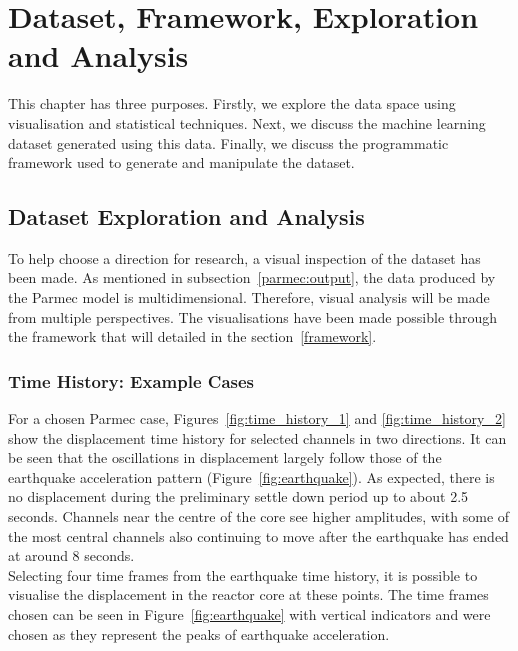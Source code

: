 \chapter{Dataset, Framework, Exploration and Analysis}
\label{cha:dataset}

This chapter has three purposes. Firstly, we explore  the data space using visualisation and statistical techniques. Next, we discuss the machine learning dataset generated using this data. Finally, we discuss the programmatic framework used to generate and manipulate the dataset.

\section{Dataset Exploration and Analysis} \label{data:visualisation}

To help choose a direction for research, a visual inspection of the dataset has been made. As mentioned in subsection~\ref{parmec:output}, the data produced by the Parmec model is multidimensional. Therefore, visual analysis will be made from multiple perspectives. The visualisations have been made possible through the framework that will detailed in the section~\ref{framework}. 

\subsection{Time History: Example Cases}


For a chosen Parmec case, Figures~\ref{fig:time_history_1} and \ref{fig:time_history_2} show the displacement time history for selected channels in two directions. It can be seen that the oscillations in displacement largely follow those of the earthquake acceleration pattern (Figure~\ref{fig:earthquake}). As expected, there is no displacement during the preliminary settle down period up to about 2.5 seconds. Channels near the centre of the core see higher amplitudes, with some of the most central channels also continuing to move after the earthquake has ended at around 8 seconds.  
\\

\noindent
Selecting four time frames from the earthquake time history, it is possible to visualise the displacement in the reactor core at these points. The time frames chosen can be seen in Figure~\ref{fig:earthquake} with vertical indicators and were chosen as they represent the peaks of earthquake acceleration. 
\\

